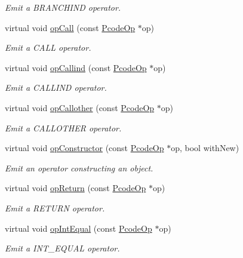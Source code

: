 \begin{DoxyCompactItemize}
\begin{DoxyCompactList}\small\item\em Emit a B\+R\+A\+N\+C\+H\+I\+ND operator. \end{DoxyCompactList}\item 
virtual void \mbox{\hyperlink{class_print_c_aa03349d27cfe1d81e6e3854cd0eb9252}{op\+Call}} (const \mbox{\hyperlink{class_pcode_op}{Pcode\+Op}} $\ast$op)
\begin{DoxyCompactList}\small\item\em Emit a C\+A\+LL operator. \end{DoxyCompactList}\item 
virtual void \mbox{\hyperlink{class_print_c_ad6fc72a7fd707785bd06ac9c6496153b}{op\+Callind}} (const \mbox{\hyperlink{class_pcode_op}{Pcode\+Op}} $\ast$op)
\begin{DoxyCompactList}\small\item\em Emit a C\+A\+L\+L\+I\+ND operator. \end{DoxyCompactList}\item 
virtual void \mbox{\hyperlink{class_print_c_abbb7090206096f88016bf1cf4ea8a234}{op\+Callother}} (const \mbox{\hyperlink{class_pcode_op}{Pcode\+Op}} $\ast$op)
\begin{DoxyCompactList}\small\item\em Emit a C\+A\+L\+L\+O\+T\+H\+ER operator. \end{DoxyCompactList}\item 
virtual void \mbox{\hyperlink{class_print_c_aee706d2e639807a35d0a1c161f3da137}{op\+Constructor}} (const \mbox{\hyperlink{class_pcode_op}{Pcode\+Op}} $\ast$op, bool with\+New)
\begin{DoxyCompactList}\small\item\em Emit an operator constructing an object. \end{DoxyCompactList}\item 
virtual void \mbox{\hyperlink{class_print_c_a07f096ed92e4254ae0595a7beff314e1}{op\+Return}} (const \mbox{\hyperlink{class_pcode_op}{Pcode\+Op}} $\ast$op)
\begin{DoxyCompactList}\small\item\em Emit a R\+E\+T\+U\+RN operator. \end{DoxyCompactList}\item 
virtual void \mbox{\hyperlink{class_print_c_ad49c66c871316b8f5c5bf00106a78fcf}{op\+Int\+Equal}} (const \mbox{\hyperlink{class_pcode_op}{Pcode\+Op}} $\ast$op)
\begin{DoxyCompactList}\small\item\em Emit a I\+N\+T\+\_\+\+E\+Q\+U\+AL operator. \end{DoxyCompactList}\item 

\end{DoxyCompactItemize}
